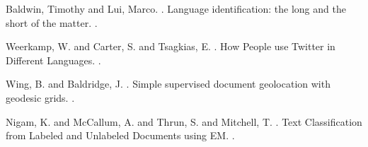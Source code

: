 \documentclass[11pt]{article}
\begin{document}
\begin{thebibliography}{}
Baldwin, Timothy and Lui, Marco.
.
\newblock Language identification: the long and the short of the matter.
.

Weerkamp, W. and Carter, S. and Tsagkias, E.
.
\newblock How People use Twitter in Different Languages.
.

Wing, B. and Baldridge, J.
.
\newblock  Simple supervised document geolocation with geodesic grids.
.

Nigam, K. and McCallum, A. and Thrun, S. and Mitchell, T.
.
\newblock  Text Classification from Labeled and Unlabeled Documents using EM.
.


\end{thebibliography}
\end{document}
